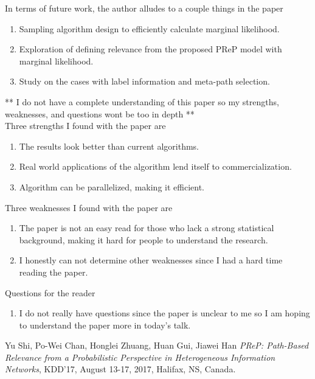 \documentclass[12pt]{article}
\theoremstyle{remark}
\begin{document}
	In terms of future work, the author alludes to a couple things in the paper
	
	\begin{enumerate}
		\item Sampling algorithm design to efficiently calculate marginal likelihood.
		\item Exploration of defining relevance from the proposed PReP model with marginal likelihood.
		\item Study on the cases with label information and meta-path selection.
	\end{enumerate}

	** I do not have a complete understanding of this paper so my strengths, weaknesses, and questions wont be too in depth ** \\

	Three strengths I found with the paper are
	\begin{enumerate}
		\item The results look better than current algorithms. 
		\item Real world applications of the algorithm lend itself to commercialization. 
		\item Algorithm can be parallelized, making it efficient.
	\end{enumerate} 
	\vspace{0.5cm}
	
	Three weaknesses I found with the paper are
	\begin{enumerate}
		\item The paper is not an easy read for those who lack a strong statistical background, making it hard for people to understand the research.
		\item I honestly can not determine other weaknesses since I had a hard time reading the paper.
	\end{enumerate}
	\vspace{0.5cm}
	
	Questions for the reader
	\begin{enumerate}
		\item I do not really have questions since the paper is unclear to me so I am hoping to understand the paper more in today's talk. 
	\end{enumerate}
	\vspace{0.5cm}
	
	\begin{thebibliography}{unsrt}
		Yu Shi, Po-Wei Chan, Honglei Zhuang, Huan Gui, Jiawei Han \emph{PReP: Path-Based Relevance from a Probabilistic Perspective in Heterogeneous Information Networks}, KDD’17, August 13-17, 2017, Halifax, NS, Canada.
	\end{thebibliography}
	
\end{document}
